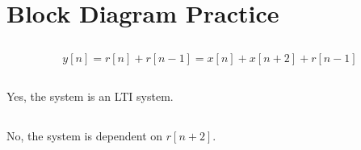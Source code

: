 \documentclass{article}
\begin{document}
\subsection{}

\section{Block Diagram Practice}

\subsection{}

\begin{equation}
    y[n] = r[n] + r[n - 1] = x[n] + x[n + 2] + r[n - 1]
\end{equation}

\subsection{}

Yes, the system is an LTI system.

\subsection{}

No, the system is dependent on \(r[n + 2]\).

\subsection{}

\subsection{}

\subsection{}
\end{document}
